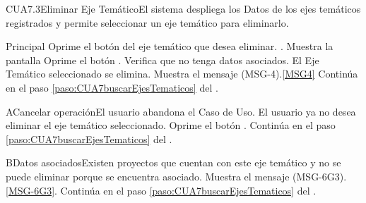 	\begin{UseCase}{CUA7.3}{Eliminar Eje Temático}{El sistema despliega los Datos de los ejes temáticos registrados y permite seleccionar un eje temático para eliminarlo.}
	\end{UseCase}

	\begin{UCtrayectoria}{Principal}
			\UCpaso[\UCactor] Oprime el botón  del eje temático que desea eliminar.
			.
			\UCpaso Muestra la pantalla   
			\UCpaso [\UCactor] Oprime el botón .
			\UCpaso Verifica que no tenga datos asociados.  
			\UCpaso El Eje Temático seleccionado se elimina.
			\UCpaso Muestra el mensaje (MSG-4).\ref{MSG4}
			\UCpaso Continúa en el paso \ref{paso:CUA7buscarEjesTematicos} del .
	\end{UCtrayectoria}

		\begin{UCtrayectoriaA}{A}{Cancelar operación}{El usuario abandona el Caso de Uso.}
			\UCpaso[\UCactor] El usuario ya no desea eliminar el eje temático seleccionado.
			\UCpaso[\UCactor] Oprime el botón .
			\UCpaso Continúa en el paso \ref{paso:CUA7buscarEjesTematicos} del .
		\end{UCtrayectoriaA}

		 \begin{UCtrayectoriaA}{B}{Datos asociados}{Existen proyectos que cuentan con este eje temático y no se puede eliminar porque se encuentra asociado.}
			\UCpaso Muestra el mensaje (MSG-6G3).\ref{MSG-6G3}.
			\UCpaso Continúa en el paso \ref{paso:CUA7buscarEjesTematicos} del .
		\end{UCtrayectoriaA}
